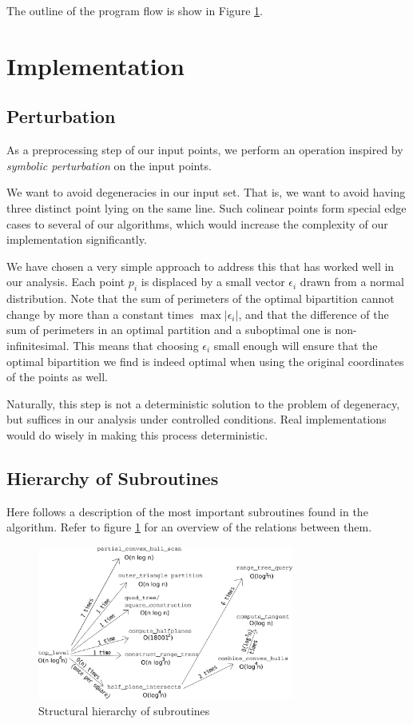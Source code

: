 \documentclass{article}
\newcommand{\figref}[1]{Figure \ref{#1}}
\begin{document}
The outline of the program flow is show in \figref{fig:hierarchy}.

\section{Implementation}

\subsection{Perturbation}

As a preprocessing step of our input points, we perform an operation inspired by \textit{symbolic perturbation} \cite{edelsbrunner90} on the input points. 

We want to avoid degeneracies in our input set. That is, we want to avoid having three distinct point lying on the same line. Such colinear points form special edge cases to several of our algorithms, which would increase the complexity of our implementation significantly. 

We have chosen a very simple approach to address this that has worked well in our analysis. Each point $p_i$ is displaced by a small vector $\epsilon_i$ drawn from a normal distribution. Note that the sum of perimeters of the optimal bipartition cannot change by more than a constant times $\max |\epsilon_i|$, and that the difference of the sum of perimeters in an optimal partition and a suboptimal one is non-infinitesimal. This means that choosing $\epsilon_i$ small enough will ensure that the optimal bipartition we find is indeed optimal when using the original coordinates of the points as well.

Naturally, this step is not a deterministic solution to the problem of degeneracy, but suffices in our analysis under controlled conditions. Real implementations would do wisely in making this process deterministic.

\subsection{Hierarchy of Subroutines}

Here follows a description of the most important subroutines found in the algorithm. Refer to figure \ref{fig:hierarchy} for an overview of the relations between them.

\begin{figure}[ht]
    \centering
    \includegraphics[width=0.75\textwidth]{hierarchy.png}
    \caption{Structural hierarchy of subroutines}
    \label{fig:hierarchy}
\end{figure}
\end{document}
